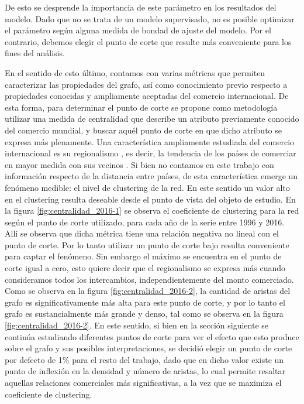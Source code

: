 \documentclass[class=article, crop=false]{standalone}
\begin{document}
De esto se desprende la importancia de este parámetro en los resultados del modelo. Dado que no se trata de un modelo supervisado, no es posible optimizar el parámetro según alguna medida de bondad de ajuste del modelo. Por el contrario, debemos elegir el punto de corte que resulte más conveniente para los fines del análisis. 

En el sentido de esto último, contamos con varias métricas que permiten caracterizar las propiedades del grafo, así como conocimiento previo respecto a propiedades conocidas y ampliamente aceptadas del comercio internacional. De esta forma, para determinar el punto de corte se propone como metodología utilizar una medida de centralidad que describe un atributo previamente conocido del comercio mundial, y buscar aquél punto de corte en que dicho atributo se expresa más plenamente. Una característica ampliamente estudiada del comercio internacional es su regionalismo \citep{das2004regionalism}, es decir, la tendencia de los países de comerciar en mayor medida con sus vecinos \citep{Head2014}. Si bien no contamos en este trabajo con información respecto de la distancia entre países, de esta característica emerge un fenómeno medible: el nivel de clustering de la red. En este sentido un valor alto en el clustering resulta deseable desde el punto de vista del objeto de estudio. En la figura \ref{fig:centralidad_2016-1} se observa el coeficiente de clustering para la red según el punto de corte utilizado, para cada año de la serie entre 1996 y 2016. Allí se observa que dicha métrica tiene una relación negativa no lineal con el punto de corte. Por lo tanto utilizar un punto de corte bajo resulta conveniente para captar el fenómeno. Sin embargo el máximo se encuentra en el punto de corte igual a cero, esto quiere decir que el regionalismo se expresa más cuando consideramos todos los intercambios, independientemente del monto comerciado. Como se observa en la figura \ref{fig:centralidad_2016-2}, la cantidad de aristas del grafo es significativamente más alta para este punto de corte, y por lo tanto el grafo es sustancialmente más grande y denso, tal como se observa en la figura \ref{fig:centralidad_2016-2}. En este sentido, si bien en la sección siguiente se continúa estudiando diferentes puntos de corte para ver el efecto que esto produce sobre el grafo y sus posibles interpretaciones, se decidió elegir un punto de corte por defecto de 1\% para el resto del trabajo, dado que en dicho valor existe un punto de inflexión en la densidad y número de aristas, lo cual permite resaltar aquellas relaciones comerciales más significativas, a la vez que se maximiza el coeficiente de clustering.
\end{document}
